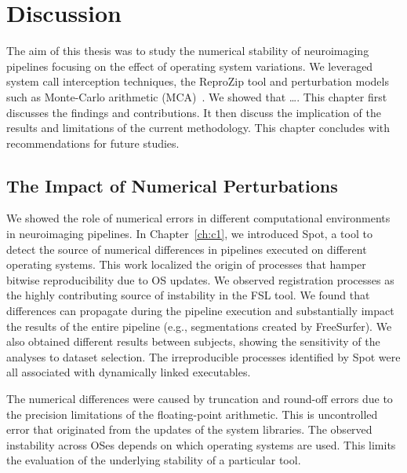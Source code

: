 \chapter{Discussion}
\label{ch:discussion}
\renewcommand\thesection{\@arabic\c@chapter.\@arabic\c@section}

The aim of this thesis was to study the numerical stability of neuroimaging pipelines focusing on the effect
of operating system variations. We leveraged system call interception techniques,
the ReproZip tool and perturbation models such as Monte-Carlo arithmetic (MCA)~\cite{Parker1997-qq}. 
We showed that \dots.
This chapter first discusses the findings and contributions.
It then discuss the implication of the results and limitations of the current methodology.
This chapter concludes with recommendations for future studies.


\section{The Impact of Numerical Perturbations}

We showed the role of numerical errors in different computational environments in neuroimaging pipelines.
In Chapter~\ref{ch:c1}, we introduced Spot, a tool to detect the source of numerical differences in pipelines
executed on different operating systems. 
This work localized the origin of processes that hamper bitwise reproducibility due to OS updates.
We observed registration processes as the highly contributing source of instability in the FSL tool. 
We found that differences can propagate during the pipeline execution and substantially impact
the results of the entire pipeline (e.g., segmentations created by FreeSurfer).
We also obtained different results between subjects, showing the sensitivity of the analyses to dataset selection.
The irreproducible processes identified by Spot were all associated with dynamically linked executables.


The numerical differences were caused by truncation and round-off errors
due to the precision limitations of the floating-point arithmetic.
This is uncontrolled error that originated from the updates of the system libraries.
The observed instability across OSes
depends on which operating systems are used. This limits the evaluation of the underlying stability of a particular tool.

